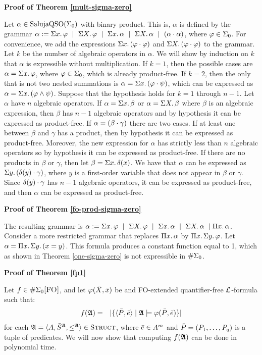 \textbf{Proof of Theorem \ref{mult-sigma-zero}}

Let $\alpha \in \sqso(\loge{0})$ with binary product. This is, $\alpha$ is defined by the grammar $\alpha := \sa{x}\varphi \ \mid \ \sa{X}\varphi \ \mid \ \sa{x}\alpha \ \mid \ \sa{X}\alpha \ \mid \ (\alpha\mult\alpha)$, where $\varphi \in \loge{0}$. For convenience, we add the expressions $\sa{x}(\varphi\mult\varphi)$ and $\sa{X}(\varphi\mult\varphi)$ to the grammar. Let $k$ be the number of algebraic operators in $\alpha$. We will show by induction on $k$ that $\alpha$ is expressible without multiplication. If $k = 1$, then the possible cases are $\alpha = \sa{x}\varphi$, where $\varphi\in\loge{0}$, which is already product-free. If $k = 2$, then the only that is not two nested summations is $\alpha = \sa{x}(\varphi\mult\psi)$, which can be expressed as $\alpha = \sa{x}(\varphi\wedge\psi)$. Suppose that the hypothesis holds for $k = 1$ through $n-1$. Let $\alpha$ have $n$ algebraic operators. If $\alpha = \sa{x}\beta$ or $\alpha = \sa{X}\beta$ where $\beta$ is an algebraic expression, then $\beta$ has $n-1$ algebraic operators and by hypothesis it can be expressed as product-free. If $\alpha = (\beta \mult \gamma)$ there are two cases. If at least one between $\beta$ and $\gamma$ has a product, then by hypothesis it can be expressed as product-free. Moreover, the new expression for $\alpha$ has strictly less than $n$ algebraic operators so by hypothesis it can be expressed as product-free. If there are no products in $\beta$ or $\gamma$, then let $\beta = \sa{x}\delta(x)$. We have that $\alpha$ can be expressed as $\sa{y}(\delta(y)\mult\gamma)$, where $y$ is a first-order variable that does not appear in $\beta$ or $\gamma$. Since $\delta(y)\mult\gamma$ has $n-1$ algebraic operators, it can be expressed as product-free, and then $\alpha$ can be expressed as product-free.

\textbf{Proof of Theorem \ref{fo-prod-sigma-zero}}

The resulting grammar is $\alpha := \sa{x}\varphi \ \mid \ \sa{X} \varphi \ \mid \ \sa{x}\alpha \ \mid \ \sa{X}\alpha \ \mid \pa{x}\alpha$. Consider a more restricted grammar that replaces $\pa{x}\alpha$ by $\pa{x}\sa{y}\varphi$. Let $\alpha = \pa{x}\sa{y}(x = y)$. This formula produces a constant function equal to 1, which as shown in Theorem \ref{one-sigma-zero} is not expressible in $\E{0}$. 

\textbf{Proof of Theorem \ref{fp1}}

Let $f \in \XE{0}$, and let $\varphi(\X,\x)$ be and {\sc FO}-extended quantifier-free $\L$-formula such that:
\begin{eqnarray*}
	f(\A) &=& \vert \{\langle \P,\e  \rangle \mid \A \models \varphi(\P,\e) \} \vert
\end{eqnarray*}
for each $\A = \langle A, \S^{\A}, \leq^{\A} \rangle \in \str$, where $\e \in A^m$ and $\P = (P_1,\ldots,P_q)$ is a tuple of predicates. We will now show that computing $f(\A)$ can be done in polynomial time.

